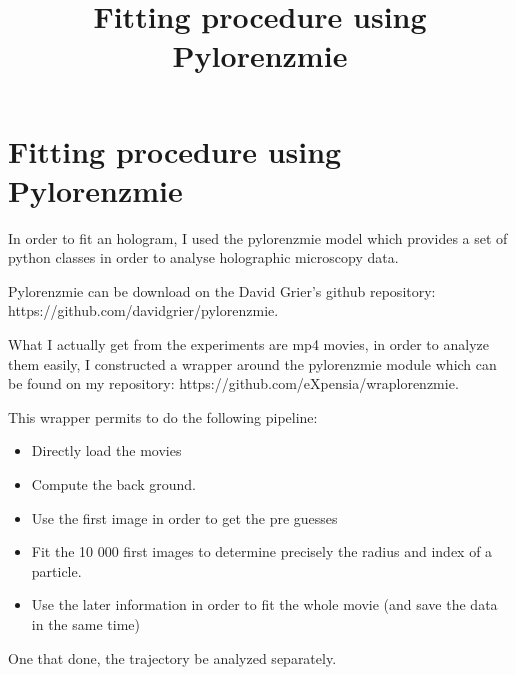 \documentclass[12pt]{article}
\title{Fitting procedure using Pylorenzmie}
\date{}
\providecommand{\tightlist}{%
      \setlength{\itemsep}{0pt}\setlength{\parskip}{0pt}}
\begin{document}
    
    
    
\maketitle
    
    \hypertarget{fitting-pipeline-using-pylorenzmie}{%
\section{Fitting procedure using
Pylorenzmie}\label{fitting-pipeline-using-pylorenzmie}}

In order to fit an hologram, I used the pylorenzmie model which provides
a set of python classes in order to analyse holographic microscopy data.

Pylorenzmie can be download on the David Grier's github repository:
https://github.com/davidgrier/pylorenzmie.

What I actually get from the experiments are mp4 movies, in order to
analyze them easily, I constructed a wrapper around the pylorenzmie
module which can be found on my repository:
https://github.com/eXpensia/wraplorenzmie.

This wrapper permits to do the following pipeline:

\begin{itemize}
\tightlist
\item
  Directly load the movies
\item
  Compute the back ground.
\item
  Use the first image in order to get the pre guesses
\item
  Fit the 10 000 first images to determine precisely the radius and
  index of a particle.
\item
  Use the later information in order to fit the whole movie (and save
  the data in the same time)
\end{itemize}

One that done, the trajectory be analyzed separately.
\end{document}
